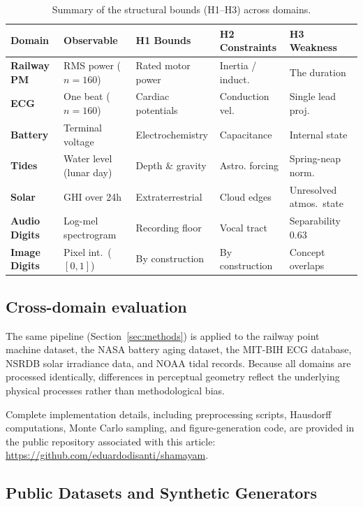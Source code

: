 \documentclass[10pt]{article}
\theoremstyle{plain}
\theoremstyle{definition}
\theoremstyle{remark}
\begin{document}
\begin{table}[ht]
\centering
\small
\begin{tabular}{p{2.2cm} p{3.8cm} p{3cm} p{2.5cm} p{2.8cm}}
\toprule
\textbf{Domain} & \textbf{Observable} & \textbf{H1 Bounds} & \textbf{H2 Constraints} & \textbf{H3 Weakness} \\
\midrule
\textbf{Railway PM} & RMS power ($n=160$) & Rated motor power & Inertia / induct. & The duration \\
\textbf{ECG} & One beat ($n=160$) & Cardiac potentials & Conduction vel. & Single lead proj. \\
\textbf{Battery} & Terminal voltage & Electrochemistry & Capacitance & Internal state \\
\textbf{Tides} & Water level (lunar day) & Depth \& gravity & Astro. forcing & Spring-neap norm. \\
\textbf{Solar} & GHI over 24h & Extraterrestrial & Cloud edges & Unresolved atmos.\ state \\
\textbf{Audio Digits} & Log-mel spectrogram & Recording floor & Vocal tract & Separability 0.63 \\
\textbf{Image Digits}& Pixel int.\ ($[0,1]$) & By construction & By construction & Concept overlaps \\
\bottomrule
\end{tabular}
\caption{Summary of the structural bounds (H1--H3) across domains.}
\label{tab:hypotheses_summary}
\end{table}

\subsection{Cross-domain evaluation}

The same pipeline (Section~\ref{sec:methods}) is applied to the railway point machine dataset, the NASA 
battery aging dataset, the MIT-BIH ECG database, NSRDB solar irradiance data, and NOAA tidal records. 
Because all domains are processed identically, differences in perceptual 
geometry reflect the underlying physical processes rather than methodological 
bias.

Complete implementation details, including preprocessing scripts, Hausdorff
computations, Monte Carlo sampling, and figure-generation code, are provided in
the public repository associated with this article:
\url{https://github.com/eduardodisanti/shamayam}.

\subsection{Public Datasets and Synthetic Generators}
\label{sec:datasets}
\end{document}
